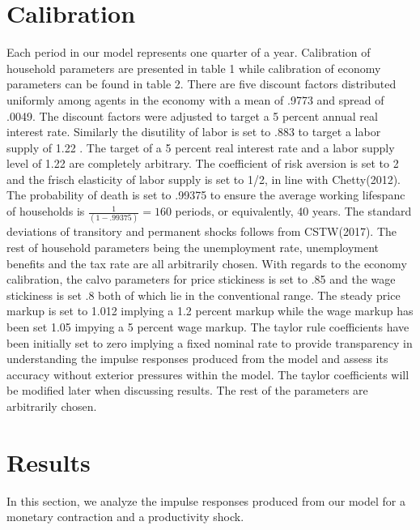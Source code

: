 \documentclass[titlepage]{\econtex}\providecommand{\texname}{BufferStockTheory}
\providecommand{\TableDir}{Tables}
\begin{document}
\hypertarget{Calibration}{}
\section{Calibration}



Each period in our model represents one quarter of a year. Calibration of household parameters are presented in table 1 while calibration of economy parameters can be found in table 2. There are five discount factors distributed uniformly among agents in the economy with a mean of .9773 and spread of .0049. The discount factors were adjusted to target a 5 percent annual real interest rate. Similarly the disutility of labor is set to .883 to target a labor supply of 1.22 . The target of a 5 percent real interest rate and a labor supply level of 1.22 are completely arbitrary.  The coefficient of risk aversion is set to 2 and the frisch elasticity of labor supply is set to 1/2, in line with Chetty(2012).  The probability of death is set to .99375 to ensure the average working lifespanc of households is $ \frac{1}{(1-.99375)} = 160$ periods, or equivalently, 40 years.  The standard deviations of transitory and permanent shocks follows from CSTW(2017). The rest of household parameters being the unemployment rate, unemployment benefits and the tax rate are all arbitrarily chosen. With regards to the economy calibration, the calvo parameters for price stickiness is set to .85 and the wage stickiness is set .8 both of which lie in the conventional range. The steady price markup is set to 1.012 implying a 1.2 percent markup while the wage markup has been set 1.05 impying a 5 percent wage markup. The taylor rule coefficients have been initially set to zero implying a fixed nominal rate to provide transparency in understanding the impulse responses produced from the model and assess its accuracy without exterior pressures within the model. The taylor coefficients will be modified later when discussing results. The rest of the parameters are arbitrarily chosen. 






\hypertarget{Results}{}
\section{Results}

In this section, we analyze the impulse responses produced from our model for a monetary contraction and a productivity shock.
\end{document}
